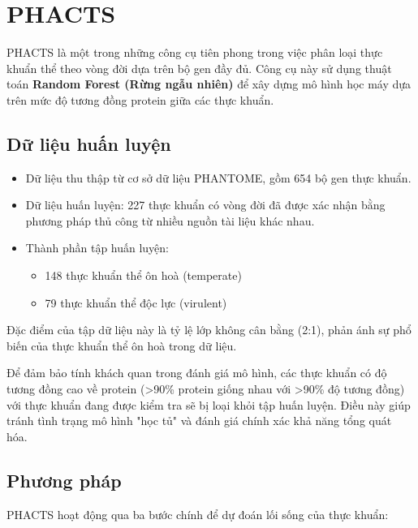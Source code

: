 \section{PHACTS}

PHACTS\cite{mcnair2012phacts} là một trong những công cụ tiên phong trong việc phân loại thực khuẩn thể theo vòng đời dựa trên bộ gen đầy đủ. Công cụ này sử dụng thuật toán \textbf{Random Forest (Rừng ngẫu nhiên)} để xây dựng mô hình học máy dựa trên mức độ tương đồng protein giữa các thực khuẩn.

\subsection{Dữ liệu huấn luyện}

\begin{itemize}
    \item Dữ liệu thu thập từ cơ sở dữ liệu PHANTOME, gồm 654 bộ gen thực khuẩn.
    \item Dữ liệu huấn luyện: 227 thực khuẩn có vòng đời đã được xác nhận bằng phương pháp thủ công từ nhiều nguồn tài liệu khác nhau.
    \item Thành phần tập huấn luyện: 
    \begin{itemize}
        \item 148 thực khuẩn thể ôn hoà (temperate)
        \item 79 thực khuẩn thể độc lực (virulent)
    \end{itemize}
\end{itemize}
Đặc điểm của tập dữ liệu này là tỷ lệ lớp không cân bằng (2:1), phản ánh sự phổ biến của thực khuẩn thể ôn hoà trong dữ liệu.

Để đảm bảo tính khách quan trong đánh giá mô hình, các thực khuẩn có độ tương đồng cao về protein (>90\% protein giống nhau với >90\% độ tương đồng) với thực khuẩn đang được kiểm tra sẽ bị loại khỏi tập huấn luyện. Điều này giúp tránh tình trạng mô hình "học tủ" và đánh giá chính xác khả năng tổng quát hóa.


\subsection{Phương pháp}

PHACTS hoạt động qua ba bước chính để dự đoán lối sống của thực khuẩn:

